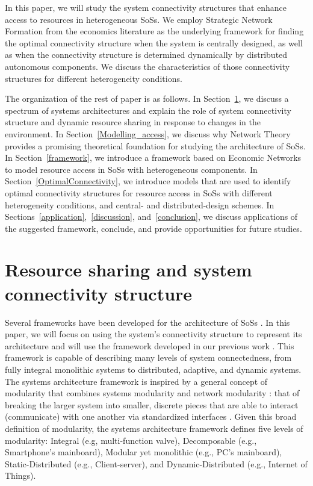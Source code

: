 \documentclass[journal,onecolumn]{IEEEtran}
\theoremstyle{plain}
\begin{document}
In this paper, we will study the system connectivity structures that enhance access to resources in heterogeneous SoSs. We employ Strategic Network Formation from the economics literature as the underlying framework for finding the optimal connectivity structure when the system is centrally designed, as well as when the connectivity structure is determined dynamically by distributed autonomous components. We discuss the characteristics of those connectivity structures for different heterogeneity conditions.  

The organization of the rest of paper is as follows. In Section~\ref{RS_and_Connectivity}, we discuss a spectrum of systems architectures and explain the role of system connectivity structure and dynamic resource sharing in response to changes in the  environment. In Section~\ref{Modelling_access}, we discuss why Network Theory provides a promising theoretical foundation for studying the architecture of SoSs. In Section~\ref{framework}, we introduce a framework based on Economic Networks to model resource access in SoSs with heterogeneous components. In Section~\ref{OptimalConnectivity}, we introduce models that are used to identify optimal connectivity structures for resource access in SoSs with different heterogeneity conditions, and central- and distributed-design schemes. In Sections~\ref{application},~\ref{discussion}, and~\ref{conclusion}, we discuss applications of the suggested framework, conclude, and provide opportunities for future studies.




\section{Resource sharing and system connectivity structure}
\label{RS_and_Connectivity}

Several frameworks have been developed for the architecture of SoSs \citep{maier2009art,rhodes2009architecting,morganwalp2002system}. In this paper, we will focus on using the system's connectivity structure to represent its architecture and will use the framework developed in our previous work \citep{heydari2014,mosleh2015monolithic}. This framework is capable of describing many levels of system connectedness, from fully integral monolithic systems to distributed, adaptive, and dynamic systems. The systems architecture framework is inspired by a general concept of modularity that combines systems modularity \citep{baldwin2000design} and network modularity \citep{newman2006modularity}: that of breaking the larger system into smaller, discrete pieces that are able to interact (communicate) with one another via standardized interfaces \citep{langlois2002modularity}. Given this broad definition of modularity, the systems architecture framework defines five levels of modularity:  Integral (e.g, multi-function valve),  Decomposable (e.g., Smartphone's mainboard),  Modular yet monolithic (e.g., PC's mainboard),  Static-Distributed (e.g., Client-server), and  Dynamic-Distributed (e.g., Internet of Things).
\end{document}
